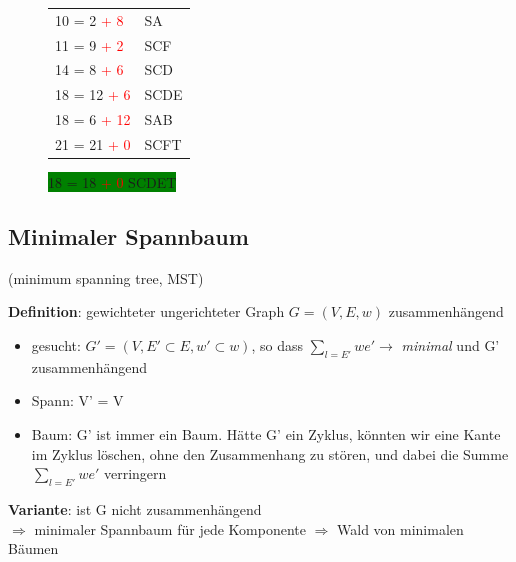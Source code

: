 \begin{figure}[htbp]
\begin{minipage}{4cm}
\begin{tabular}{L{2cm} | L{2cm}}
                10 = 2 \textcolor{red}{+ 8}  & SA\\
                11 = 9 \textcolor{red}{+ 2}  & SCF \\
                14 = 8 \textcolor{red}{+ 6}  & SCD \\
                18 = 12 \textcolor{red}{+ 6}  & SCDE \\
                18 = 6 \textcolor{red}{+ 12}  & SAB \\
                21 = 21 \textcolor{red}{+ 0}  & SCFT \\
            \end{tabular}
            \colorbox{green}{18 = 18  \textcolor{red}{+ 0} \hspace*{0.5cm} SCDET}
        \end{minipage}
    \end{figure}


    \subsection*{Minimaler Spannbaum} (minimum spanning tree, MST)\\

    \textbf{Definition}: gewichteter ungerichteter Graph $G = (V, E, w)$ zusammenhängend\\
    \begin{itemize}
        \item gesucht: $G' = (V, E' \subset E, w' \subset w)$, so dass $\sum\limits_{l = E'} we' \rightarrow$ \emph{minimal} und G' zusammenhängend
        \item \glqq Spann\grqq: V' = V
        \item \glqq Baum\grqq : G' ist immer ein Baum. Hätte G' ein Zyklus, könnten wir eine Kante im Zyklus löschen, ohne den Zusammenhang zu stören, und dabei die Summe $\sum\limits_{l=E'}we'$ verringern
    \end{itemize}

    \textbf{Variante}: ist G nicht zusammenhängend\\
    \hspace*{1cm} $\Rightarrow$ minimaler Spannbaum für jede Komponente $\Rightarrow$ Wald von minimalen Bäumen\\

